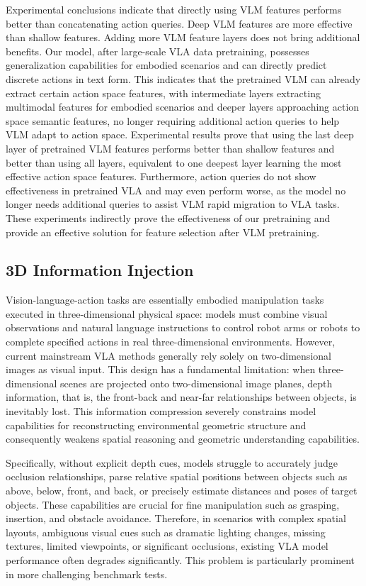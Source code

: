 \documentclass[11pt,a4paper]{article}
\begin{document}
Experimental conclusions indicate that directly using VLM features performs better than concatenating action queries. Deep VLM features are more effective than shallow features. Adding more VLM feature layers does not bring additional benefits. Our model, after large-scale VLA data pretraining, possesses generalization capabilities for embodied scenarios and can directly predict discrete actions in text form. This indicates that the pretrained VLM can already extract certain action space features, with intermediate layers extracting multimodal features for embodied scenarios and deeper layers approaching action space semantic features, no longer requiring additional action queries to help VLM adapt to action space. Experimental results prove that using the last deep layer of pretrained VLM features performs better than shallow features and better than using all layers, equivalent to one deepest layer learning the most effective action space features. Furthermore, action queries do not show effectiveness in pretrained VLA and may even perform worse, as the model no longer needs additional queries to assist VLM rapid migration to VLA tasks. These experiments indirectly prove the effectiveness of our pretraining and provide an effective solution for feature selection after VLM pretraining.

\subsection{3D Information Injection}

Vision-language-action tasks are essentially embodied manipulation tasks executed in three-dimensional physical space: models must combine visual observations and natural language instructions to control robot arms or robots to complete specified actions in real three-dimensional environments. However, current mainstream VLA methods generally rely solely on two-dimensional images as visual input. This design has a fundamental limitation: when three-dimensional scenes are projected onto two-dimensional image planes, depth information, that is, the front-back and near-far relationships between objects, is inevitably lost. This information compression severely constrains model capabilities for reconstructing environmental geometric structure and consequently weakens spatial reasoning and geometric understanding capabilities.

Specifically, without explicit depth cues, models struggle to accurately judge occlusion relationships, parse relative spatial positions between objects such as above, below, front, and back, or precisely estimate distances and poses of target objects. These capabilities are crucial for fine manipulation such as grasping, insertion, and obstacle avoidance. Therefore, in scenarios with complex spatial layouts, ambiguous visual cues such as dramatic lighting changes, missing textures, limited viewpoints, or significant occlusions, existing VLA model performance often degrades significantly. This problem is particularly prominent in more challenging benchmark tests.
\end{document}
